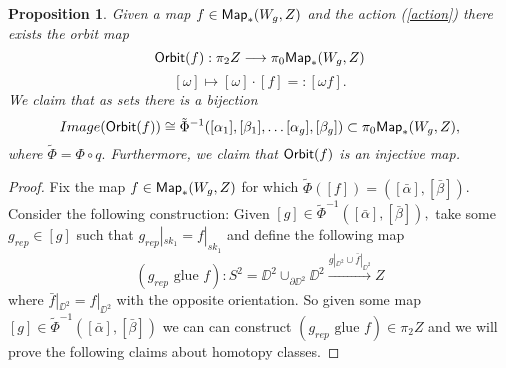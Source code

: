 \documentclass{amsart}
\newtheorem{prop}[theorem]{Proposition}
\theoremstyle{definition}
\theoremstyle{remark}
\newcommand{\xra}{\xrightarrow}
\DeclareMathOperator{\id}{\sf id}
\begin{document}
\begin{prop}
Given a map $f \in {\sf Map}_{\ast}(W_{g}, Z)$ and the action (\ref{action}) there exists the orbit map 
$${\sf Orbit}(f): \pi_{2}Z \longrightarrow \pi_{0}{\sf Map}_{\ast}(W_{g}, Z)$$ 
$$[\omega] \mapsto [\omega] \cdot [f] =: [\omega f].$$ We claim that as sets there is a bijection $$Image({\sf Orbit}(f)) \cong  \tilde{\Phi}^{-1}([\alpha_{1}], [\beta_{1}], \hdots [\alpha_{g}], [\beta_{g}]) \subset \pi_{0}{\sf Map}_{\ast}(W_{g}, Z),$$ where $\tilde{\Phi} = \Phi \circ q.$ Furthermore, we claim that ${\sf Orbit}(f)$ is an injective map.
\end{prop}
\begin{proof}
Fix the map $f \in {\sf Map}_{\ast}(W_{g}, Z)$ for which $\tilde{\Phi}([f]) = ([\bar{\alpha}] ,[\bar{\beta}])$. 
Consider the following construction: 
Given $[g] \in \tilde{\Phi}^{-1}([\bar{\alpha}] ,[\bar{\beta}]),$ take some $g_{rep} \in [g]$ such that $g_{rep}|_{sk_{1}} = f|_{sk_{1}}$ and define the following map
$$
(g_{rep} \text{ glue } f): S^{2} = \DD^{2} \cup_{\partial \DD^{2}} \DD^{2} \xra{g|_{\DD^{2}} \cup \bar{f}|_{\DD^{2}}} Z
$$
where $\bar{f}|_{\DD^{2}} = f|_{\DD^{2}}$ with the opposite orientation. So given some map $[g] \in \tilde{\Phi}^{-1}([\bar{\alpha}] ,[\bar{\beta}])$ we can can construct $(g_{rep} \text{ glue } f) \in \pi_{2}Z$ and we will prove the following claims about homotopy classes. \newline



\end{proof}
\end{document}
